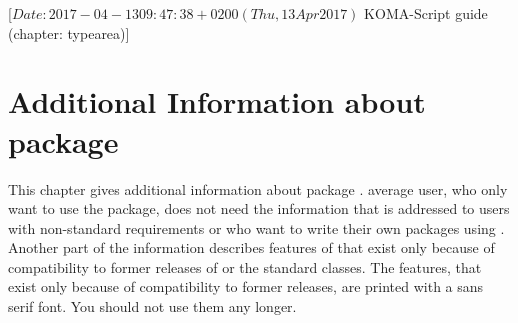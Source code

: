 %
%
%
%
%
%
%
%
% 
%
%
%
%

                 [$Date: 2017-04-13 09:47:38 +0200 (Thu, 13 Apr 2017) $
                  KOMA-Script guide (chapter: typearea)]


\chapter{Additional Information about package }
\BeginIndexGroup
{}


This chapter gives additional information about package
.  average user, who only want to use the package,
does not need the information that is addressed to users with non-standard
requirements or who want to write their own packages using
. Another part of the information describes features of
 that exist only because of compatibility to former releases
of \KOMAScript{} or the standard classes. The features, that exist only
because of compatibility to former \KOMAScript{} releases, are printed with a
sans serif font. You should not use them any longer.


